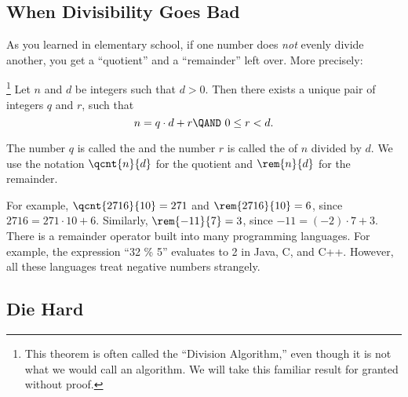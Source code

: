 \subsection{When Divisibility Goes Bad}

As you learned in elementary school, if one number does \emph{not}
evenly divide another, you get a ``quotient'' and a ``remainder'' left
over.  More precisely:

\begin{theorem}%
\footnote{This theorem is often called the ``Division Algorithm,'' even
though it is not what we would call an algorithm.  We will take this
familiar result for granted without proof.}  Let $n$ and $d$ be
integers such that $d > 0$.  Then there exists a unique pair of
integers $q$ and $r$, such that
\begin{equation}\label{nqdr}
n = q \cdot d + r \QAND\ 0  \leq r < d.
\end{equation}
\end{theorem}

The number $q$ is called the  and the number $r$ is
called the  of $n$ divided by $d$.  We use the
notation $\qcnt{n}{d}$ for the quotient and $\rem{n}{d}$ for the
remainder.

For example, $\qcnt{2716}{10} = 271$ and $\rem{2716}{10} = 6$, since
$2716 = 271 \cdot 10 + 6$.  Similarly, $\rem{-11}{7} = 3$, since $-11
= (-2) \cdot 7 + 3$.  There is a remainder operator built into many
programming languages.  For example, the expression ``32 \% 5''
evaluates to 2 in Java, C, and C++.  However, all these languages
treat negative numbers strangely.

\subsection{Die Hard}


